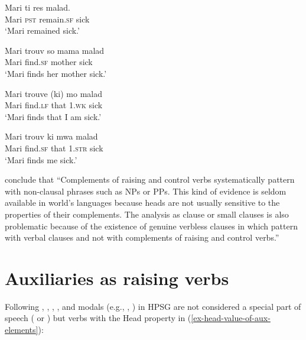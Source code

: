 \documentclass[output=paper
	        ,collection
	        ,collectionchapter
 	        ,biblatex
                ,babelshorthands
                ,newtxmath
                ,draftmode
                ,colorlinks, citecolor=brown
]{langscibook}
\begin{document}
\begin{exe}
\ex \begin{xlist}
\ex 
\gll Mari ti res  malad.\\
     Mari \textsc{pst} remain.\textsc{sf} sick\\\hfill\citep[]{HenriandLaurens2011}
\glt `Mari remained sick.'

\ex 
\gll Mari trouv  so mama malad\\
     Mari find.\textsc{sf} \POSS{} mother sick\\
\glt `Mari finds her mother sick.'

\ex 
\gll Mari trouve (ki) mo malad\\
     Mari find.\textsc{lf} that 1\SG.\textsc{wk} sick\\
\glt `Mari finds that I am sick.'

\ex 
\gll Mari trouv ki mwa malad\\
     Mari find.\textsc{sf} that 1\SG.\textsc{str} sick\\
\glt `Mari finds me sick.'
\end{xlist}
\end{exe}

\citet[]{HenriandLaurens2011} conclude that ``Complements of raising and control verbs systematically pattern with non-clausal phrases such as NPs or PPs. This kind of evidence is seldom available in world's languages because heads are not usually sensitive to the properties of their complements. The analysis as clause or small clauses is also problematic because of the existence of genuine verbless clauses in  which pattern with verbal clauses and not with complements of raising and control verbs.''




\section{Auxiliaries as raising verbs}
\label{sec-auxiliaries-as-raising-verbs}

Following \citep{Ross69a-u,Gazdaretal1982, Sagetal2020}, 
 , , , and modals (e.g., , ) in HPSG are not considered a special part of speech ( or ) but verbs with the Head property in (\ref{ex-head-value-of-aux-elements}):

\begin{exe}
\ex \label{ex-head-value-of-aux-elements}
   \impl
\avmtmp{
	[head &	[aux & $+$] ]
}
 \end{exe}
 
\end{document}
